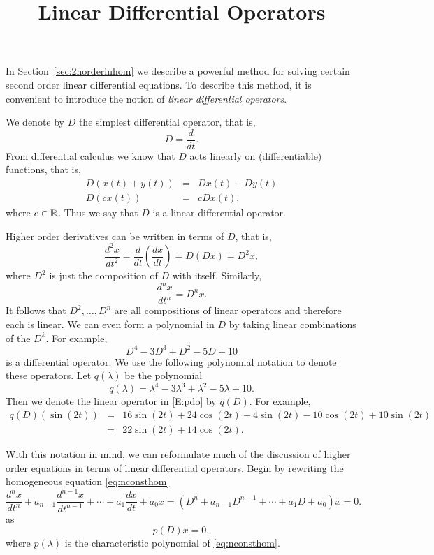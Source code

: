 \documentclass{ximera}
\title{Linear Differential Operators}
\begin{document}
\begin{abstract}
\end{abstract}
\maketitle

  
\label{S:LDO}

In Section~\ref{sec:2norderinhom} we describe a powerful method for 
solving certain second order linear differential equations.  To describe 
this method, it is convenient to introduce the notion of {\em linear 
differential operators}.

We denote by $D$ the simplest differential 
operator, that is,
\[
D=\frac{d}{dt}.
\]
From differential calculus we know that $D$ acts linearly on 
(differentiable) functions, that is,
\begin{eqnarray*}
D(x(t)+y(t)) & = & Dx(t) + Dy(t) \\
D(cx(t)) & = & cDx(t),
\end{eqnarray*}
where $c\in\mbox{$\Bbb{R}$}$.  Thus we say that $D$ is a linear differential operator.

Higher order derivatives can be written in terms of $D$, that is,
\[
\frac{d^2x}{dt^2} = \frac{d}{dt}\left(\frac{dx}{dt}\right) = D(Dx) = D^2x,
\]
where $D^2$ is just the composition of $D$ with itself.  Similarly, 
\[
\frac{d^nx}{dt^n} = D^nx.
\]
It follows that $D^2,\ldots,D^n$ are all compositions of linear operators
and therefore each is linear.  We can even form a polynomial in $D$ by taking
linear combinations of the $D^k$.  For example,
\begin{equation}  \label{E:pdo}
D^4 - 3D^3 + D^2 -5D + 10 
\end{equation}
is a differential operator.  
We use the following polynomial notation to 
denote these operators.  Let $q(\lambda)$ be the polynomial
\[
q(\lambda) = \lambda^4 -3\lambda^3 + \lambda^2 - 5\lambda +10.
\]
Then we denote the linear operator in \eqref{E:pdo} by $q(D)$.  For example,
\begin{eqnarray*}
q(D)(\sin(2t)) & = & 16\sin(2t) + 24\cos(2t) - 4\sin(2t) - 10\cos(2t) + 
10\sin(2t) \\ & = & 22\sin(2t) + 14\cos(2t).
\end{eqnarray*}


With this notation in mind, we can reformulate much of the discussion of 
higher order equations in terms of linear differential operators.  Begin by 
rewriting the homogeneous equation \eqref{eq:nconsthom} 
\[
\frac{d^nx}{dt^n}+a_{n-1}\frac{d^{n-1}x}{dt^{n-1}}+\cdots+
a_1\frac{dx}{dt}+a_0x = (D^n+a_{n-1}D^{n-1}+\cdots+a_1D+a_0)x = 0.
\]
as
\begin{equation}  \label{E:opern2}
p(D)x = 0,
\end{equation}
where $p(\lambda)$ is the characteristic 
polynomial 
of \eqref{eq:nconsthom}.
\end{document}
